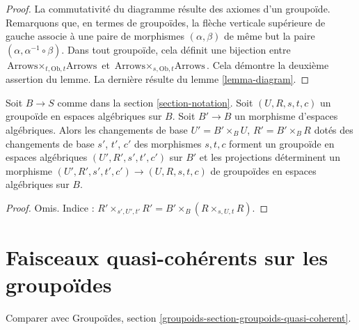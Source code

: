 \begin{proof}
La commutativité du diagramme résulte des axiomes d'un groupoïde. Remarquons que, en termes de groupoïdes, la flèche verticale supérieure de gauche associe à une paire de morphismes $(\alpha, \beta)$ de même but la paire $(\alpha, \alpha^{-1} \circ \beta)$. Dans tout groupoïde, cela définit une bijection entre $\text{Arrows} \times_{t, \text{Ob}, t} \text{Arrows}$ et $\text{Arrows} \times_{s, \text{Ob}, t} \text{Arrows}$. Cela démontre la deuxième assertion du lemme. La dernière résulte du lemme \ref{lemma-diagram}.
\end{proof}

\begin{lemma}
\label{lemma-base-change-groupoid}
Soit $B \to S$ comme dans la section \ref{section-notation}. Soit $(U, R, s, t, c)$ un groupoïde en espaces algébriques sur $B$. Soit $B' \to B$ un morphisme d'espaces algébriques. Alors les changements de base $U' = B' \times_B U$, $R' = B' \times_B R$ dotés des changements de base $s'$, $t'$, $c'$ des morphismes $s, t, c$ forment un groupoïde en espaces algébriques $(U', R', s', t', c')$ sur $B'$ et les projections déterminent un morphisme $(U', R', s', t', c') \to (U, R, s, t, c)$ de groupoïdes en espaces algébriques sur $B$.
\end{lemma}

\begin{proof}
Omis. Indice : $R' \times_{s', U', t'} R' = B' \times_B (R \times_{s, U, t} R)$.
\end{proof}





\section{Faisceaux quasi-cohérents sur les groupoïdes}
\label{section-groupoids-quasi-coherent}

\noindent
Comparer avec Groupoïdes, section \ref{groupoids-section-groupoids-quasi-coherent}.

